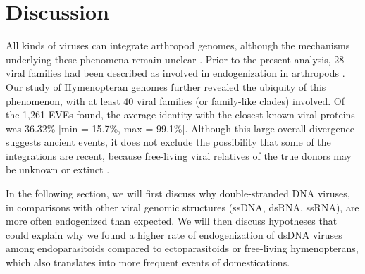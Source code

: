  
\section{Discussion}

All kinds of viruses can integrate arthropod genomes, although the mechanisms underlying these phenomena remain unclear \citep{katzourakis_endogenous_2010, gilbert_diversity_2022}. Prior to the present analysis, 28 viral families had been described as involved in endogenization in arthropods \citep{gilbert_diversity_2022}. Our study of Hymenopteran genomes further revealed the ubiquity of this phenomenon, with at least 40 viral families (or family-like clades) involved. Of the 1,261 EVEs found, the average identity with the closest known viral proteins was 36.32\% [min = 15.7\%, max = 99.1\%]. Although this large overall divergence suggests ancient events, it does not exclude the possibility that some of the integrations are recent, because free-living viral relatives of the true donors may be unknown or extinct \citep{junglen_virus_2013}.

In the following section, we will first discuss why double-stranded DNA viruses, in comparisons with other viral genomic structures (ssDNA, dsRNA, ssRNA), are more often endogenized than expected. We will then discuss hypotheses that could explain why we found a higher rate of endogenization of dsDNA viruses among  endoparasitoids compared to ectoparasitoids or free-living hymenopterans, which also translates into more frequent events of domestications.\\

